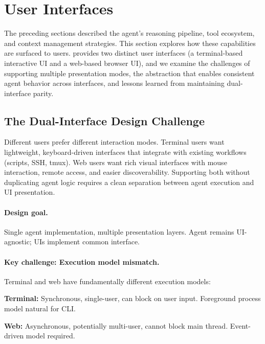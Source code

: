\section{User Interfaces}
\label{sec:user_interfaces}

The preceding sections described the agent's reasoning pipeline, tool ecosystem, and context management strategies. This section explores how these capabilities are surfaced to users. \name provides two distinct user interfaces (a terminal-based interactive UI and a web-based browser UI), and we examine the challenges of supporting multiple presentation modes, the abstraction that enables consistent agent behavior across interfaces, and lessons learned from maintaining dual-interface parity.

\subsection{The Dual-Interface Design Challenge}
\label{sec:dual_interface_challenge}

Different users prefer different interaction modes. Terminal users want lightweight, keyboard-driven interfaces that integrate with existing workflows (scripts, SSH, tmux). Web users want rich visual interfaces with mouse interaction, remote access, and easier discoverability. Supporting both without duplicating agent logic requires a clean separation between agent execution and UI presentation.

\paragraph{Design goal.} Single agent implementation, multiple presentation layers. Agent remains UI-agnostic; UIs implement common interface.

\paragraph{Key challenge: Execution model mismatch.} Terminal and web have fundamentally different execution models:

\begin{packeditemize}
\item \textbf{Terminal:} Synchronous, single-user, can block on user input. Foreground process model natural for CLI.
\item \textbf{Web:} Asynchronous, potentially multi-user, cannot block main thread. Event-driven model required.
\end{packeditemize}

